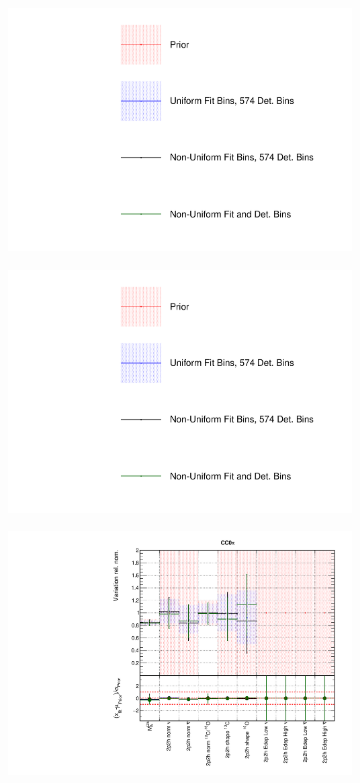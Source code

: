 \begin{figure}
\centering
\begin{subfigure}{0.3\textwidth}
  \centering
  \includegraphics[width=1.0\linewidth,  trim={5mm  80mm 0mm 0mm}, clip]{figs/polyasmvs_leg}
\end{subfigure}
\begin{subfigure}{0.3\textwidth}
  \centering
  \includegraphics[width=1.0\linewidth,  trim={5mm  0mm 0mm 95mm}, clip]{figs/polyasmvs_leg}
\end{subfigure}
\begin{subfigure}{0.49\textwidth}
  \centering
  \includegraphics[width=0.9\linewidth]{figs/polyasmvsxsec_1}

\end{subfigure}
\end{figure}
